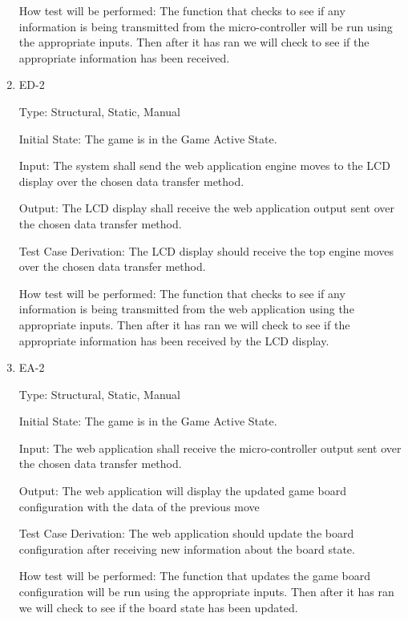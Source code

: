 \documentclass[12pt, titlepage]{article}
\begin{document}
\begin{enumerate}
    How test will be performed: The function that checks to see if any information is being transmitted from the micro-controller
    will be run using the appropriate inputs. Then after it has ran we will check to see if the appropriate information has been received.

    \item{ED-2\\}

    Type: Structural, Static, Manual
                      
    Initial State: The game is in the Game Active State.
                        
    Input: The system shall send the web application engine moves to the LCD display over the
    chosen data transfer method.
                        
    Output: The LCD display shall receive the web application output sent over the chosen data transfer
    method.
                        
    Test Case Derivation: The LCD display should receive the top engine moves over the chosen data transfer method. 

    How test will be performed: The function that checks to see if any information is being transmitted from the web application 
    using the appropriate inputs. Then after it has ran we will check to see if the appropriate information has been received by the LCD display.

    \item{EA-2\\}

    Type: Structural, Static, Manual
                      
    Initial State: The game is in the Game Active State.
                        
    Input: The web application shall receive the micro-controller output sent over the chosen data transfer
    method.
                        
    Output: The web application will display the updated game board configuration with the data
    of the previous move
                        
    Test Case Derivation: The web application should update the board configuration after receiving new information about the board state. 

    How test will be performed: The function that updates the game board configuration
    will be run using the appropriate inputs. Then after it has ran we will check to see if the board state has been updated.


\end{enumerate}
\end{document}

